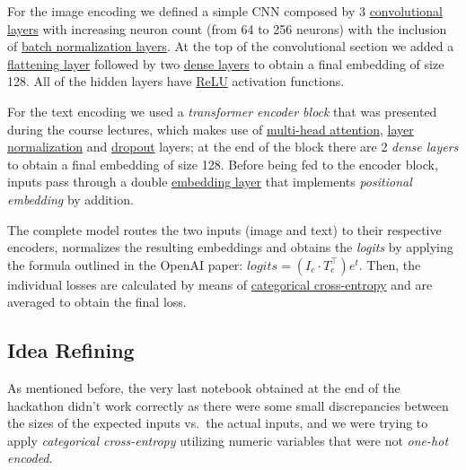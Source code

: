 \documentclass[10pt,twocolumn,letterpaper]{article}
\begin{document}
For the image encoding we defined a simple CNN composed by 3 \href{https://www.tensorflow.org/api_docs/python/tf/keras/layers/Conv2D}{convolutional layers} with increasing neuron count (from 64 to 256 neurons) with the inclusion of \href{https://www.tensorflow.org/api_docs/python/tf/keras/layers/BatchNormalization}{batch normalization layers}.
At the top of the convolutional section we added a \href{https://www.tensorflow.org/api_docs/python/tf/keras/layers/Flatten}{flattening layer} followed by two \href{https://www.tensorflow.org/api_docs/python/tf/keras/layers/Dense}{dense layers} to obtain a final embedding of size 128.
All of the hidden layers have \href{https://www.tensorflow.org/api_docs/python/tf/keras/layers/ReLU}{ReLU} activation functions.

For the text encoding we used a \textit{transformer encoder block} that was presented during the course lectures, which makes use of \href{https://www.tensorflow.org/api_docs/python/tf/keras/layers/MultiHeadAttention}{multi-head attention}, \href{https://www.tensorflow.org/api_docs/python/tf/keras/layers/LayerNormalization}{layer normalization} and \href{https://www.tensorflow.org/api_docs/python/tf/keras/layers/Dropout}{dropout} layers; at the end of the block there are 2 \textit{dense layers} to obtain a final embedding of size 128.
Before being fed to the encoder block, inputs pass through a double \href{https://www.tensorflow.org/api_docs/python/tf/keras/layers/Embedding}{embedding layer} that implements \textit{positional embedding} by addition.

The complete model routes the two inputs (image and text) to their respective encoders, normalizes the resulting embeddings and obtains the \textit{logits} by applying the formula outlined in the OpenAI paper: $logits = (I_e \cdot T_e^{\top})e^t$.
Then, the individual losses are calculated by means of \href{https://www.tensorflow.org/api_docs/python/tf/keras/losses/CategoricalCrossentropy}{categorical cross-entropy} and are averaged to obtain the final loss.

\subsection{Idea Refining}
As mentioned before, the very last notebook obtained at the end of the hackathon didn't work correctly as there were some small discrepancies between the sizes of the expected inputs vs.\ the actual inputs, and we were trying to apply \textit{categorical cross-entropy} utilizing numeric variables that were not \textit{one-hot encoded}.
\end{document}
